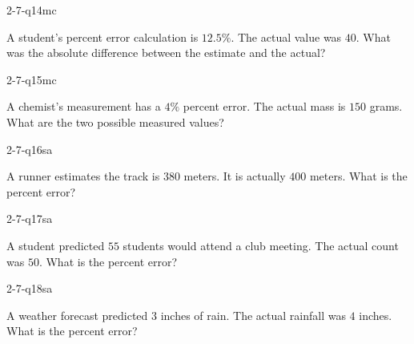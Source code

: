 \begin{practiceQuestion}{2-7-q14}{mc}
\begin{questionText}
A student's percent error calculation is $12.5\%$. The actual value was $40$. What was the absolute difference between the estimate and the actual?
\end{questionText}
\end{practiceQuestion}

\begin{practiceQuestion}{2-7-q15}{mc}
\begin{questionText}
A chemist's measurement has a $4\%$ percent error. The actual mass is $150$ grams. What are the two possible measured values?
\end{questionText}
\end{practiceQuestion}


\begin{practiceQuestion}{2-7-q16}{sa}
\begin{questionText}
A runner estimates the track is $380$ meters. It is actually $400$ meters. What is the percent error?
\end{questionText}
\end{practiceQuestion}

\begin{practiceQuestion}{2-7-q17}{sa}
\begin{questionText}
A student predicted $55$ students would attend a club meeting. The actual count was $50$. What is the percent error?
\end{questionText}
\end{practiceQuestion}

\begin{practiceQuestion}{2-7-q18}{sa}
\begin{questionText}
A weather forecast predicted $3$ inches of rain. The actual rainfall was $4$ inches. What is the percent error?
\end{questionText}
\end{practiceQuestion}

